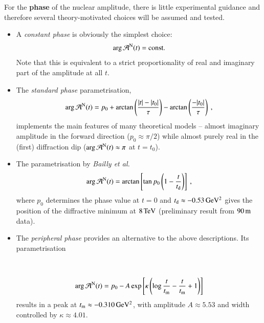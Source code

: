 For the {\bf phase} of the nuclear amplitude, there is little experimental guidance and therefore several theory-motivated choices will be assumed and tested.

\begin{itemize}
\item A {\it constant phase} is obviously the simplest choice:
%
\begin{equation}
\label{eq:nuc phase const}
\arg {\cal A}^{\rm N}(t) = \hbox{const.}
\end{equation}
Note that this is equivalent to a strict proportionality of real and imaginary part of the amplitude at all $t$.
%
\item The {\it standard phase} parametrisation,
\begin{equation}
\label{eqn:nuc_phase_standard}
\arg {\cal A}^{\rm N}(t) = p_{0} + \arctan \left(\frac{|t|-|t_{0}|}{\tau}\right) -  \arctan \left(\frac{-|t_{0}|}{\tau}\right) \: ,
\end{equation}
implements the main features of many theoretical models -- almost imaginary amplitude in the forward direction ($p_0 \approx \pi/2$) while almost purely real in the (first) diffraction dip 
($\arg {\cal A}^{\rm N}(t) \approx \pi$ at $t = t_{0}$). \todo{[to be corrected]}

%
\item The parametrisation by {\em Bailly et al.}~\cite{bailly87} \todo{[to be written]}
\begin{equation}
\label{eq:nuc phase std}
	\arg {\cal A}^{\rm N}(t) = \arctan \left[ \tan p_0 \left(1 - {t\over t_{\rm d}} \right) \right]\ ,
\end{equation}
where $p_0$ determines the phase value at $t=0$ and $t_{\rm d} \approx -0.53\,{\rm GeV^2}$ gives the position of the diffractive minimum at $8\,{\rm TeV}$ (preliminary result from $90\,{\rm m}$ data).
%
\item The {\it peripheral phase} \cite{kl94}  provides an alternative to the above descriptions. Its parametrisation

\\

\begin{equation}
\label{eq:nuc phase per}
\arg {\cal A}^{\rm N}(t) = p_0 - A \exp\left[ \kappa \left( \log {t\over t_{\rm m}} - {t\over t_{\rm m}} + 1 \right) \right]
\end{equation}
results in a peak at $t_{\rm m} \approx -0.310\,{\rm GeV^2}$, with amplitude $A \approx 5.53$ and width controlled by $\kappa \approx 4.01$.
\end{itemize}
%
\begin{figure}
\begin{center}
\vskip-3mm
\caption{}
\label{fig:phase_illustration}
\end{center}
\end{figure}

